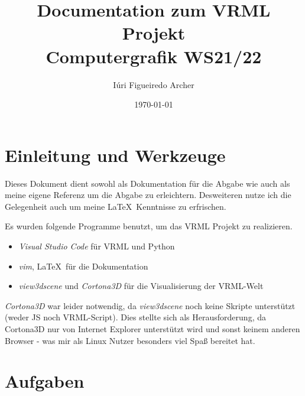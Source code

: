 \documentclass{article}
\author{Iúri Figueiredo Archer}
\date{\today}
\title{Documentation zum VRML Projekt\\\large{Computergrafik WS21/22}}
\begin{document}
\maketitle

\section*{Einleitung und Werkzeuge}

Dieses Dokument dient sowohl als Dokumentation für die Abgabe wie auch
als meine eigene Referenz um die Abgabe zu erleichtern. Desweiteren
nutze ich die Gelegenheit auch um meine \LaTeX\ Kenntnisse zu
erfrischen.

Es wurden folgende Programme benutzt, um das VRML Projekt zu
realizieren.
\begin{itemize}
\item \textit{Visual Studio Code} für VRML und Python
\item \textit{vim}, \LaTeX\ für die Dokumentation
\item \textit{view3dscene} und \textit{Cortona3D} für die
Visualisierung der VRML-Welt
\end{itemize}

\textit{Cortona3D} war leider notwendig, da \textit{view3dscene} noch
keine Skripte unterstützt (weder JS noch VRML-Script). 
Dies stellte sich als Herausforderung, da Cortona3D nur von Internet
Explorer unterstützt wird und sonst keinem anderen Browser - was mir
als Linux Nutzer besonders viel Spaß bereitet hat.



\section{Aufgaben}
\end{document}

